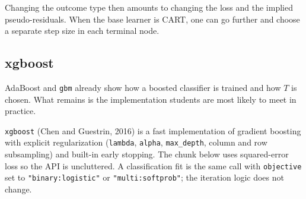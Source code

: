 \documentclass[
]{book}
\begin{document}
Changing the outcome type then amounts to changing the loss and the implied pseudo-residuals. When the base learner is CART, one can go further and choose a separate step size in each terminal node.

\vspace{1.2em}

\subsection{xgboost}\label{xgboost}

AdaBoost and \texttt{gbm} already show how a boosted classifier is trained and how \(T\) is chosen. What remains is the implementation students are most likely to meet in practice.

\texttt{xgboost} (Chen and Guestrin, 2016) is a fast implementation of gradient boosting with explicit regularization (\texttt{lambda}, \texttt{alpha}, \texttt{max\_depth}, column and row subsampling) and built-in early stopping. The chunk below uses squared-error loss so the API is uncluttered. A classification fit is the same call with \texttt{objective} set to \texttt{"binary:logistic"} or \texttt{"multi:softprob"}; the iteration logic does not change.
\end{document}
